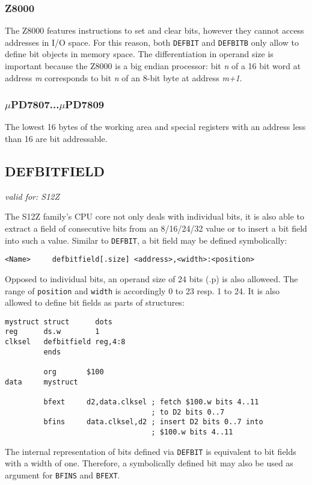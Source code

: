 \documentclass[12pt,twoside]{report}
\makeatletter
\newcommand{\tty}[1]{{\tt #1}}
\newcommand{\ttindex}[1]{\index{#1@{\tt #1}}}
\makeatother
\begin{document}
\subsubsection{Z8000}

The Z8000 features instructions to set and clear bits, however they cannot access
addresses in I/O space.  For this reason, both {\tt DEFBIT} and {\tt DEFBITB}
only allow to define bit objects in memory space.  The differentiation in operand
size is important because the Z8000 is a big endian processor: bit {\em n} of a
16 bit word at address {\em m} corresponds to bit {\em n} of an 8-bit byte at
address {\em m+1}.

\subsubsection{$\mu$PD7807...$\mu$PD7809}

The lowest 16 bytes of the working area and special registers with an address
less than 16 are bit addressable.


\subsection{DEFBITFIELD}
\ttindex{DEFBITFIELD}

{\em valid for: S12Z}

The S12Z family's CPU core not only deals with individual bits, it
is also able to extract a field of consecutive bits from an
8/16/24/32 value or to insert a bit field into such a value. Similar
to \tty{DEFBIT}, a bit field may be defined symbolically:
\begin{verbatim}
<Name>     defbitfield[.size] <address>,<width>:<position>
\end{verbatim}
Opposed to individual bits, an operand size of 24 bits (.p) is also
alloweed.  The range of \tty{position} and \tty{width} is accordingly 
0 to 23 resp. 1 to 24.  It is also allowed to define bit fields as
parts of structures:
\begin{verbatim}
mystruct struct      dots
reg      ds.w        1
clksel   defbitfield reg,4:8
         ends

         org       $100
data     mystruct

         bfext     d2,data.clksel ; fetch $100.w bits 4..11
                                  ; to D2 bits 0..7
         bfins     data.clksel,d2 ; insert D2 bits 0..7 into
                                  ; $100.w bits 4..11
\end{verbatim}
The internal representation of bits defined via \tty{DEFBIT} is
equivalent to bit fields with a width of one.  Therefore, a
symbolically defined bit may also be used as argument for
\tty{BFINS} and \tty{BFEXT}.
\end{document}
